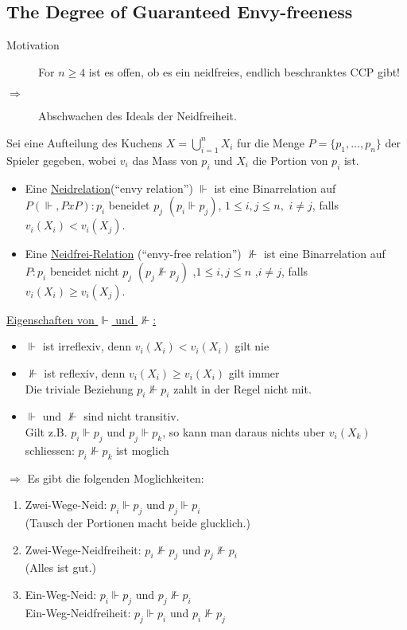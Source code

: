 \subsection{The Degree of Guaranteed Envy-freeness}
\begin{description}
 \item[Motivation] For $n\geq4$ ist es offen, ob es ein neidfreies, endlich beschranktes CCP gibt!
 \item[$\Rightarrow$] Abschwachen des Ideals der Neidfreiheit. 
\end{description}
\begin{defi}
 Sei eine Aufteilung des Kuchens $X=\bigcup\limits_{i=1}^n X_i$ fur die Menge $P=\{p_1,\dots,p_n\}$ der Spieler gegeben, wobei $v_i$
 das Mass von $p_i$ und $X_i$ die Portion von $p_i$ ist.
 \begin{itemize}
  \item Eine \underline{Neidrelation}(``envy relation'') $\Vdash$ ist eine Binarrelation auf $P(\Vdash, PxP):p_i$ beneidet 
        $p_j$ $(p_i\Vdash p_j)$, $1\leq i,j\leq n,$ $i\neq j$, falls $v_i(X_i)<v_i(X_j)$.
  \item Eine \underline{Neidfrei-Relation} (``envy-free relation'') $\nVdash$ ist eine Binarrelation auf $P:p_i$ beneidet nicht $p_j$ $(p_j
        \nVdash p_j)$ ,$1\leq i,j\leq n$ ,$i\neq j$, falls $v_i(X_i)\geq v_i(X_j)$.
 \end{itemize}
\end{defi}
\underline{Eigenschaften von $\Vdash$ und $\nVdash$:}
\begin{itemize}
 \item $\Vdash$ ist irreflexiv, denn $v_i(X_i)<v_i(X_i)$ gilt nie
 \item $\nVdash$ ist reflexiv, denn $v_i(X_i)\geq v_i(X_i)$ gilt immer\\Die triviale Beziehung $p_i \nVdash p_i$ zahlt in der Regel nicht
       mit.
 \item $\Vdash$ und $\nVdash$ sind nicht transitiv.\\
       Gilt z.B. $p_i\Vdash p_j$ und $p_j\Vdash p_k$, so kann man daraus nichts uber $v_i(X_k)$ schliessen: $p_i\nVdash p_k$ ist moglich
\end{itemize}
$\Rightarrow$ Es gibt die folgenden Moglichkeiten:
\begin{enumerate}
 \item Zwei-Wege-Neid: $p_i\Vdash p_j$ und $p_j\Vdash p_i$\\(Tausch der Portionen macht beide glucklich.)
 \item Zwei-Wege-Neidfreiheit: $p_i\nVdash p_j$ und $p_j\nVdash p_i$\\(Alles ist gut.)
 \item Ein-Weg-Neid: $p_i\Vdash p_j$ und $p_j\nVdash p_i$\\
       Ein-Weg-Neidfreiheit: $p_j\Vdash p_i$ und $p_i\nVdash p_j$
\end{enumerate}
